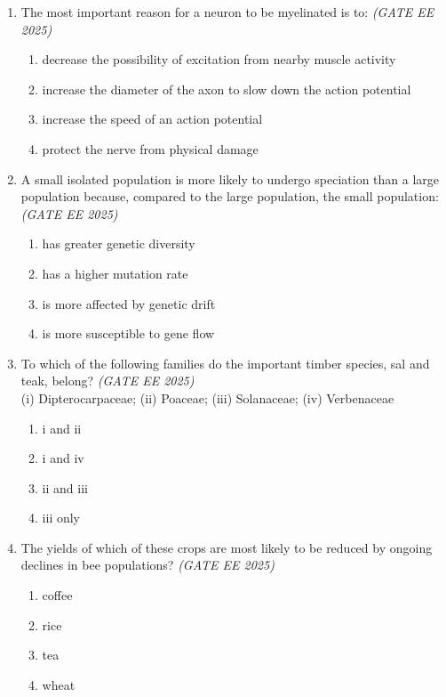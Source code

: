 \documentclass[11pt,a4paper]{article}
\begin{document}
\begin{enumerate}[leftmargin=*,label=\textbf{Q.\arabic*},resume]

\item The most important reason for a neuron to be myelinated is to: \hfill \textit{(GATE EE 2025)}
\begin{multicols}{2}
\begin{enumerate}[label=(\Alph*)]
\item decrease the possibility of excitation from nearby muscle activity
\item increase the diameter of the axon to slow down the action potential
\item increase the speed of an action potential
\item protect the nerve from physical damage
\end{enumerate}
\end{multicols}


\item A small isolated population is more likely to undergo speciation than a large population because, compared to the large population, the small population: \hfill \textit{(GATE EE 2025)}
\begin{multicols}{2}
\begin{enumerate}[label=(\Alph*)]
\item has greater genetic diversity
\item has a higher mutation rate
\item is more affected by genetic drift
\item is more susceptible to gene flow
\end{enumerate}
\end{multicols}


\item To which of the following families do the important timber species, sal and teak, belong? \hfill \textit{(GATE EE 2025)} \\
(i) Dipterocarpaceae; (ii) Poaceae; (iii) Solanaceae; (iv) Verbenaceae
\begin{multicols}{2}
\begin{enumerate}[label=(\Alph*)]
\item i and ii
\item i and iv
\item ii and iii
\item iii only
\end{enumerate}
\end{multicols}


\item The yields of which of these crops are most likely to be reduced by ongoing declines in bee populations? \hfill \textit{(GATE EE 2025)}
\begin{multicols}{2}
\begin{enumerate}[label=(\Alph*)]
\item coffee
\item rice
\item tea
\item wheat
\end{enumerate}
\end{multicols}



\end{enumerate}
\end{document}
